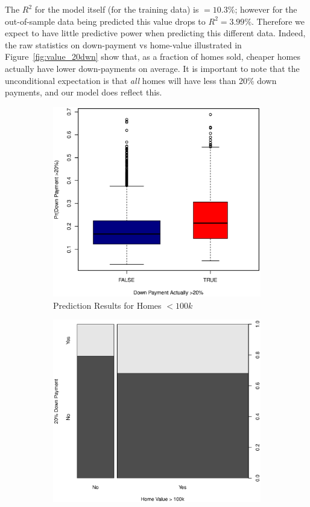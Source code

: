 \documentclass[11pt, fleqn]{article}
\begin{document}
The $R^2$ for the model itself (for the training data) is $=10.3\%$; however for the out-of-sample data being predicted this value drops to $R^2=3.99\%$.  Therefore we expect to have little predictive power when predicting this different data.  Indeed, the raw statistics on down-payment vs home-value illustrated in Figure~\vref{fig:value_20dwn} show that, as a fraction of homes sold, cheaper homes actually have lower down-payments on average. It is important to note that the unconditional expectation is that \textit{all} homes will have less than 20\% down payments, and our model does reflect this.

\begin{figure}
  \centering
  \begin{subfigure}[b]{0.49\textwidth}
    \includegraphics[scale=.5]{oos_lt100k.eps}
    \caption{Prediction Results for Homes $<100k$}
    \label{fig:oos_lt100k}
  \end{subfigure}
  \hfill
  \begin{subfigure}[b]{0.49\textwidth}
    \includegraphics[scale=.5]{home_value_vs_20_down.eps}

\end{subfigure}
\end{figure}
\end{document}
